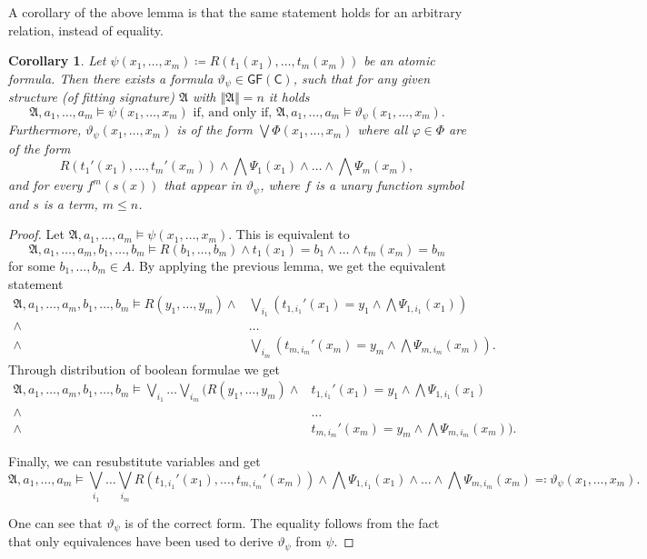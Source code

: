 \documentclass[a4paper,11pt,DIV=15]{scrartcl} %
\renewcommand{\phi}{\varphi}
\theoremstyle{plain}
\newtheorem{corollary}[theorem]{Corollary}
\theoremstyle{definition}
\newcommand{\GFC}{\mathsf{GF}(\mathsf{C})}
\renewcommand{\theta}{\vartheta}
\begin{document}
A corollary of the above lemma is that the same statement holds for an arbitrary relation, instead of equality.

\begin{corollary}
	Let $\psi(x_1,\dots,x_m)\coloneqq R(t_1(x_1),\dots,t_m(x_m))$ be an atomic formula.
	Then there exists a formula $\theta_\psi\in\GFC$, such that for any given structure (of fitting signature) $\mathfrak A$ with $\Vert\mathfrak A \Vert=n$ it holds
	$$\mathfrak A,a_1,\dots,a_m\models \psi(x_1,\dots,x_m) \text{ if, and only if, } \mathfrak A,a_1,\dots,a_m\models \theta_\psi(x_1,\dots,x_m).$$
	Furthermore, $\theta_\psi(x_1,\dots,x_m)$ is of the form $\bigvee \Phi(x_1,\dots,x_m)$ where all $\phi\in\Phi$ are of the form
	$$R(t_1'(x_1),\dots,t_m'(x_m))\land \bigwedge\Psi_1(x_1)\land \dots\land\bigwedge \Psi_m(x_m),$$
	and for every $f^m(s(x))$ that appear in $\theta_\psi$, where $f$ is a unary function symbol and $s$ is a term, $m\leq n$.
	\label{TranslationOfArbAtomics}
\end{corollary}
\begin{proof}
	Let $\mathfrak A,a_1,\dots,a_m\models\psi(x_1,\dots,x_m)$.
	This is equivalent to 
	$$\mathfrak A,a_1,\dots,a_m,b_1,\dots,b_m\models R(b_1,\dots,b_m)\land t_1(x_1)=b_1\land\dots\land t_m(x_m)=b_m$$
	for some $b_1,\dots,b_m\in A$.
	By applying the previous lemma, we get the equivalent statement
	\begin{align*}
		\mathfrak A,a_1,\dots,a_m,b_1,\dots,b_m\models R(y_1,\dots,y_m) \land& \bigvee_{i_1}\left(t_{1,i_1}'(x_1)=y_1\land \bigwedge\Psi_{1,i_1}(x_1)\right) \\
		\land& \dots \\
		\land& \bigvee_{i_m}\left(t_{m,i_m}'(x_m)=y_m\land \bigwedge\Psi_{m,i_m}(x_m)\right).
	\end{align*}
	Through distribution of boolean formulae we get
	\begin{align*}
	\mathfrak A,a_1,\dots,a_m,b_1,\dots,b_m\models \bigvee_{i_1} \dots \bigvee_{i_m} ( R(y_1,\dots,y_m)\land &
	t_{1,i_1}'(x_1)=y_1 \land \bigwedge\Psi_{1,i_1}(x_1) \\
	\land & \dots \\
	\land & t_{m,i_m}'(x_m)=y_m \land \bigwedge\Psi_{m,i_m}(x_m) ).
	\end{align*}
	
	Finally, we can resubstitute variables and get
	$$\mathfrak A,a_1,\dots,a_m\models \bigvee_{i_1}\dots\bigvee_{i_m} R(t_{1,i_1}'(x_1),\dots,t_{m,i_m}'(x_m))\land \bigwedge\Psi_{1,i_1}(x_1)\land\dots\land\bigwedge\Psi_{m,i_m}(x_m)\eqqcolon \theta_\psi(x_1,\dots,x_m).$$
	
	One can see that $\theta_\psi$ is of the correct form.
	The equality follows from the fact that only equivalences have been used to derive $\theta_\psi$ from $\psi$.
\end{proof}
\end{document}
